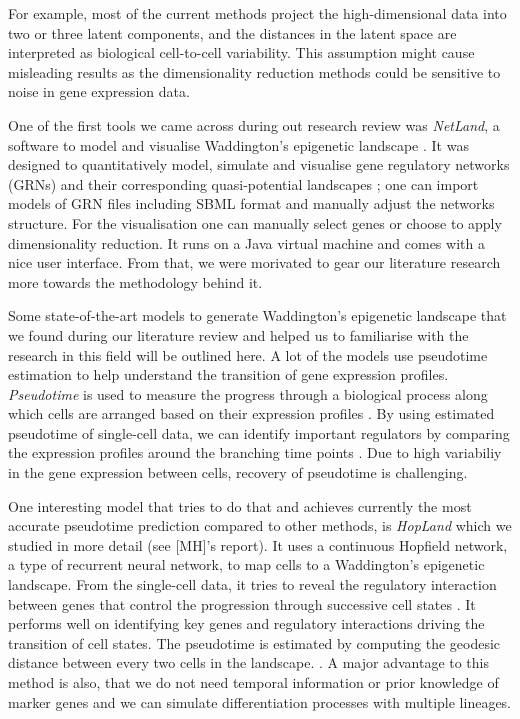 
For example, most of the current methods project the high-dimensional data into two or three latent components, and the distances in the latent space are interpreted as biological cell-to-cell variability. This assumption might cause misleading results as the dimensionality reduction methods could be sensitive to noise in gene expression data. 



One of the first tools we came across during out research review was \textit{NetLand}, a software to model and visualise Waddington's epigenetic landscape \cite{netland}. It was designed to quantitatively model, simulate and visualise gene regulatory networks (GRNs) and their corresponding quasi-potential landscapes \cite{netland}; one can import models of GRN files including SBML format and manually adjust the networks structure. For the visualisation one can manually select genes or choose to apply dimensionality reduction. It runs on a Java virtual machine and comes with a nice user interface. From that, we were morivated to gear our literature research more towards the methodology behind it. 

Some state-of-the-art models to generate Waddington's epigenetic landscape that we found during our literature review and helped us to familiarise with the research in this field will be outlined here. A lot of the models use pseudotime estimation to help understand the transition of gene expression profiles. \textit{Pseudotime} is used to measure the progress through a biological process along which cells are arranged based on their expression profiles \cite{hopland}. By using estimated pseudotime of single-cell data, we can identify important regulators by comparing  the expression profiles around the branching time points \cite{hopland}. Due to high variabiliy in the gene expression between cells, recovery of pseudotime is challenging. 

One interesting model that tries to do that and achieves currently the most accurate pseudotime prediction compared to other methods, is \textit{HopLand} which we studied in more detail (see [MH]'s report). It uses a continuous Hopfield network, a type of recurrent neural network, to map cells to a Waddington's epigenetic landscape. From the single-cell data, it tries to reveal the regulatory interaction between genes that control the progression through successive cell states \cite{hopland}. It performs well on identifying key genes and regulatory interactions driving the transition of cell states. The pseudotime is estimated by computing the geodesic distance between every two cells in the landscape. \cite{hopland}. A major advantage to this method is also, that we do not need temporal information or prior knowledge of marker genes \cite{hopland} and we can simulate differentiation processes with multiple lineages. \\

